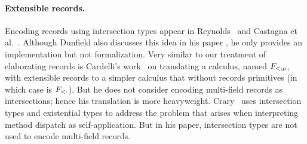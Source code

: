 \begin{comment}
In contrast to type systems for virtual classes 
and similar mechanisms, the goal of our work is to study the type
systems and basic language mechanism to better support such design patterns. 


 some researchers have designed new type
system features such as virtual classes~\cite{ernst2006virtual}, polymorphic
variants~\cite{garrigue1998programming}, while others have shown employing
programming pattern such as object algebras~\cite{oliveira2012extensibility} by
using features within existing programming languages. Both of the two approaches
have drawbacks of some kind. The first approach often involves heavyweight
designs, while the second approach still sacrifices the readability for
extensibility.
\bruno{fill me in with more details and more references!}
\end{comment}


\paragraph{Extensible records.}



Encoding records using intersection types appear in
Reynolds~\cite{reynolds1997design} and Castagna et
al.~\cite{castagna1995calculus}. Although Dunfield also discusses this idea in
his paper \cite{dunfield2014elaborating}, he only provides an implementation but
not formalization. Very similar to our treatment of elaborating records is
Cardelli's work~\cite{cardelli1992extensible} on translating a calculus, named
$ F_{<: \rho}$, with extensible records to a simpler calculus that without
records primitives (in which case is $ F_{<:} $). But he does not consider
encoding multi-field records as intersections; hence his translation is more
heavyweight. Crary~\cite{crary1998simple} uses intersection types and
existential types to address the problem that arises when interpreting method
dispatch as self-application. But in his paper, intersection types are not used
to encode multi-field records.

